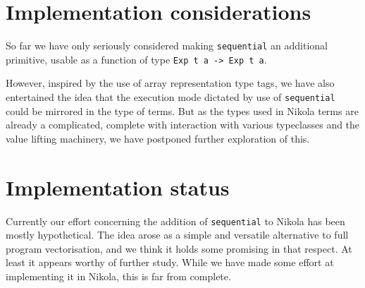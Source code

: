 \section{Implementation considerations}

So far we have only seriously considered making \texttt{sequential} an
additional primitive, usable as a function of type \texttt{Exp t a -> Exp t a}.

However, inspired by the use of array representation type tags, we have also
entertained the idea that the execution mode dictated by use of
\texttt{sequential} could be mirrored in the type of terms. But as the types
used in Nikola terms are already a complicated, complete with interaction with
various typeclasses and the value lifting machinery, we have postponed further
exploration of this.

\section{Implementation status}

Currently our effort concerning the addition of \texttt{sequential} to Nikola
has been mostly hypothetical. The idea arose as a simple and versatile
alternative to full program vectorisation, and we think it holds some promising
in that respect. At least it appears worthy of further study.  While we have
made some effort at implementing it in Nikola, this is far from complete.
